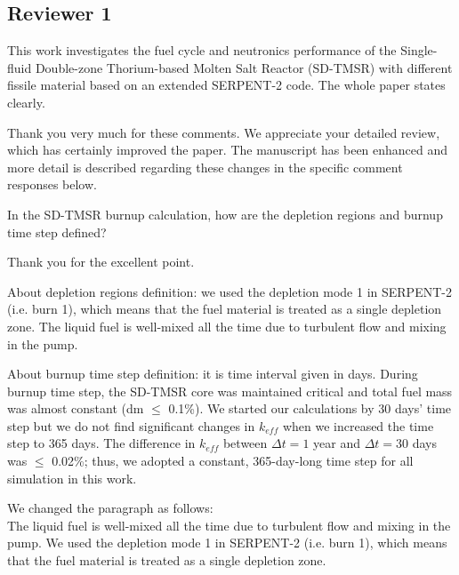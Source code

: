 \documentclass[answers,11pt]{exam}
\begin{document}
\begin{questions}
        \section*{Reviewer 1}

        \question This work investigates the fuel cycle and neutronics performance of the Single-fluid Double-zone Thorium-based Molten Salt Reactor (SD-TMSR) with different fissile material based on an extended SERPENT-2 code. The whole paper states clearly.

        \begin{solution}
                Thank you very much for these comments. We appreciate your detailed review, which has certainly improved the paper. The manuscript has been enhanced and more detail is described regarding these changes in the specific comment responses below.
        \end{solution}


        \question In the SD-TMSR burnup calculation, how are the depletion regions and burnup time step defined?
        \begin{solution}
        		  
        		  Thank you for the excellent point.
        		  
        		  About depletion regions definition: we used the depletion mode 1 in SERPENT-2 (i.e. burn 1), which means that the fuel material
        		  is treated as a single depletion zone. The liquid fuel is well-mixed all the time due to turbulent flow and mixing in the pump.
        		  
        		  About burnup time step definition: it is time interval given in days. During burnup time step, the SD-TMSR core was maintained critical and total fuel mass was almost constant (dm $\leq$ 0.1\%). We started our calculations by 30 days' time step but we do not find significant changes in $k_{eff}$ when we increased the time step to 365 days. The difference in $k_{eff}$ between $\Delta t=1$ year and $\Delta t=30$ days was $\leq$ 0.02\%; thus, we adopted a constant, 365-day-long time step for all simulation in this work.
        		  
        		      
        		  We changed the paragraph as follows:\\
        		  
        		  The liquid fuel is well-mixed all the time due to turbulent flow and mixing in the pump. We used the depletion mode 1 in SERPENT-2 (i.e. burn 1), which means that the fuel material is treated as a single depletion zone.
        		  

\end{solution}
\end{questions}
\end{document}
